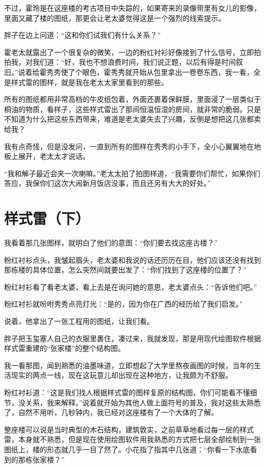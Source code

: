 不过，霍玲是在这座楼的考古项目中失踪的，如果寄来的录像带里有女儿的影像，里面又藏了楼的图纸，那更会让老太婆觉得这是一个强烈的线索提示。

胖子在边上问道：“这和你们试我们有什么关系？”

霍老太就露出了一个很复杂的微笑，一边的粉红衬衫好像接到了什么信号，立即拍拍我，对我们道：“好，我也不想浪费时间，我们说正题，以后有得是时间叙旧。”说着给霍秀秀使了个眼色，霍秀秀就开始从包里拿出一卷卷东西，我一看，全是样式雷的图样，就是我在老太太家里看到的那些。

所有的图纸都用非常高档的牛皮纸包着，外面还裹着保鲜膜，里面浸了一层类似于桐油的物质，看样子，这些样式雷出了那间恒温恒湿的房间，就非常的脆弱。只是不知道为什么把这些东西带来，难道是老太婆失去了兴趣，反倒是想把这几张都卖给我？

我有点奇怪，但是没发问，一直到所有的图样在秀秀的小手下，全小心翼翼地在地板上展开，老太太才说话。

“我和解子最近会夹一次喇嘛。”老太太拍了拍图样道，“我需要你们帮忙，如果你们答应，我保你们这次大闹新月饭店没事，而且还另有大大的好处。”

\chapter{样式雷（下）}

我看着那几张图样，就明白了他们的意图：“你们要去找这座古楼？”

粉红衬衫点头，我皱起眉头，老太婆和我说的话还历历在目，他们应该还没有找到那栋楼的具体位置，怎么突然间就要出发了：“你们找到了这座楼的位置了？”

粉红衬衫看了看老太婆，看上去是在询问她的意思，老太婆点头：“告诉他们吧。”

粉红衬衫就吩咐秀秀点亮灯光：“是的，因为你在广西的经历给了我们启发。”

说着，他拿出了一张工程用的图纸，让我们看。

胖子把玉玺塞人自己的衣服里裹住，凑过来，我就发现，那是用现代绘图软件根据样式雷重建的“张家楼”的整个结构图。

我一看那图，闻到熟悉的油墨味道，立即想起了大学里熬夜画图的时候，当年的生活现实的两点一线，现在这玩意儿却出现在这种地方，让我颇为不舒服。

粉红衬衫道：“这是我们找人根据样式雷的图样复原的结构图，你们可能看不懂细节，没关系，我来解释。”说着就开始为其他人做上面符号的普及，我对这些太熟悉了，自然不用听，几秒钟内，我已经对这座楼有了一个大体的了解。

整座楼可以说是当时典型的木石结构，建筑敦实，之前草草地看过每一层的样式雷，本身就不熟悉，但是现在使用绘图软件用我熟悉的方式把七层全部绘制到一张图纸上，楼的形态就几乎一目了然了。小花指了指其中几张道：“你看一下水底看到的那栋张家楼？”

